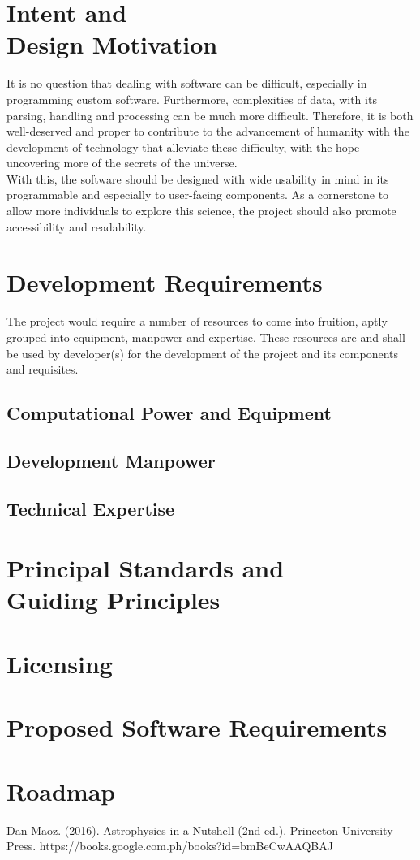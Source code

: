 \documentclass[lettersize,journal]{IEEEtran}
\begin{document}
\section{Intent and \\ Design Motivation}
It is no question that dealing with software can be difficult, especially in programming custom software. Furthermore, complexities of data, with its parsing, handling and processing can be much more difficult. Therefore, it is both well-deserved and proper to contribute to the advancement of humanity with the development of technology that alleviate these difficulty, with the hope uncovering more of the secrets of the universe. \\
With this, the software should be designed with wide usability in mind in its programmable and especially to user-facing components. As a cornerstone to allow more individuals to explore this science, the project should also promote accessibility and readability.

\section{Development Requirements}
The project would require a number of resources to come into fruition, aptly grouped into equipment, manpower and expertise. These resources are and shall be used by developer(s) for the development of the project and its components and requisites.

\subsection{Computational Power and Equipment}

\subsection{Development Manpower}

\subsection{Technical Expertise}

\section{Principal Standards and \\ Guiding Principles}

\section{Licensing}

\section{Proposed Software Requirements}

\section{Roadmap}

\begin{thebibliography}{1}


Dan Maoz. (2016). Astrophysics in a Nutshell (2nd ed.). Princeton University Press. https://books.google.com.ph/books?id=bmBeCwAAQBAJ
    
\end{thebibliography}
\end{document}
